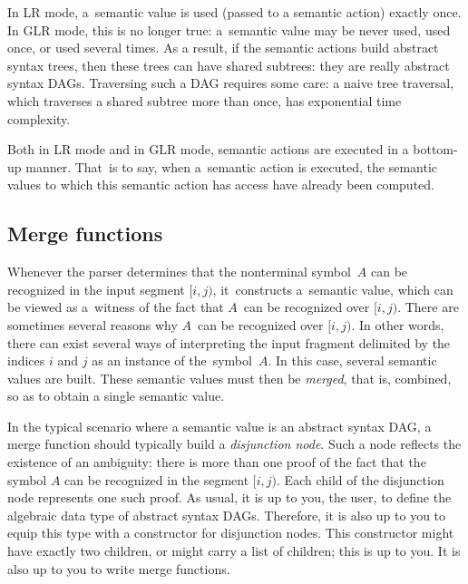 
In LR mode, a~semantic value is used (passed to a semantic action) exactly
once. In GLR mode, this is no longer true: a~semantic value may be never used,
used once, or used several times. As a result, if the semantic actions build
abstract syntax trees, then these trees can have shared subtrees: they are
really abstract syntax DAGs. Traversing such a DAG requires some care: a naive
tree traversal, which traverses a shared subtree more than once, has
exponential time complexity.

Both in LR mode and in GLR mode, semantic actions are executed in a bottom-up
manner. That~is to say, when a~semantic action is executed, the semantic
values to which this semantic action has access have already been computed.


\subsection{Merge functions}
\label{sec:GLR:merge}

Whenever the parser determines that the nonterminal symbol~$A$
can be recognized in the input segment $[i, j)$,
it~constructs a~semantic value,
which can be viewed as a~witness of the fact that
$A$~can be recognized over $[i, j)$.
%
There are sometimes several reasons
why $A$~can be recognized over $[i, j)$.
In other words,
there can exist several ways of interpreting the input fragment
delimited by the indices $i$ and $j$
as an instance of the~symbol~$A$.
%
In this case, several semantic values are built.
These semantic values must then be \emph{merged},
that is, combined, so as to obtain a single semantic value.

In the typical scenario where a semantic value is an abstract syntax DAG,
a merge function should typically build a \emph{disjunction node}.
Such a node reflects the existence of an ambiguity:
there is more than one proof of the fact that the symbol $A$
can be recognized in the segment $[i, j)$.
%
Each child of the disjunction node represents one such proof.
%
As usual, it is up to you, the user, to define the algebraic data type of
abstract syntax DAGs. Therefore, it is also up to you to equip this type with
a constructor for disjunction nodes. This constructor might have exactly two
children, or might carry a list of children; this is up to you. It is also up
to you to write merge functions.

